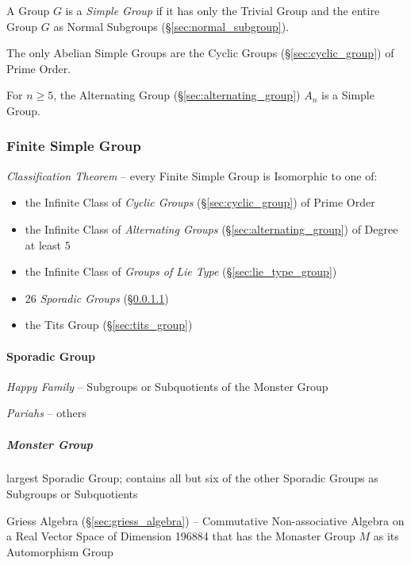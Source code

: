 A Group $G$ is a \emph{Simple Group} if it has only the Trivial Group and the
entire Group $G$ as Normal Subgroups (\S\ref{sec:normal_subgroup}).

The only Abelian Simple Groups are the Cyclic Groups
(\S\ref{sec:cyclic_group}) of Prime Order.

For $n \geq 5$, the Alternating Group (\S\ref{sec:alternating_group})
$A_n$ is a Simple Group.



\subsubsection{Finite Simple Group}\label{sec:finite_simple_group}

\emph{Classification Theorem} -- every Finite Simple Group is Isomorphic to one
of:
\begin{itemize}
  \item the Infinite Class of \emph{Cyclic Groups} (\S\ref{sec:cyclic_group}) of
    Prime Order
  \item the Infinite Class of \emph{Alternating Groups}
    (\S\ref{sec:alternating_group}) of Degree at least $5$
  \item the Infinite Class of \emph{Groups of Lie Type}
    (\S\ref{sec:lie_type_group})
  \item 26 \emph{Sporadic Groups} (\S\ref{sec:sporadic_group})
  \item the Tits Group (\S\ref{sec:tits_group})
\end{itemize}



\paragraph{Sporadic Group}\label{sec:sporadic_group}\hfill

\emph{Happy Family} -- Subgroups or Subquotients of the Monster Group

\emph{Pariahs} -- others



\subparagraph{Monster Group}\label{sec:monster_group}\hfill

largest Sporadic Group; contains all but six of the other Sporadic Groups as
Subgroups or Subquotients

Griess Algebra (\S\ref{sec:griess_algebra}) -- Commutative Non-associative
Algebra on a Real Vector Space of Dimension 196884 that has the Monaster Group
$M$ as its Automorphism Group



